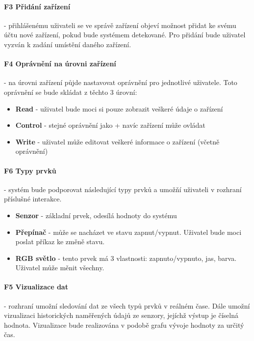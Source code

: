\paragraph{F3 Přidání zařízení}
- přihlášenému uživateli se ve správě zařízení objeví možnost přidat ke svému účtu nové zařízení, pokud bude systémem detekované. Pro přidání bude uživatel vyzván k zadání umístění daného zařízení.

\paragraph{F4 Oprávnění na úrovni zařízení}
- na úrovni zařízení půjde nastavovat oprávnění pro jednotlivé uživatele. Toto oprávnění se bude skládat z těchto 3 úrovní:
\begin{itemize}
    \item \textbf{Read} - uživatel bude moci si pouze zobrazit veškeré údaje o zařízení
    \item \textbf{Control} - stejné oprávnění jako  + navíc zařízení může ovládat
    \item \textbf{Write} - uživatel může editovat veškeré informace o zařízení (včetně oprávnění)
\end{itemize}

\paragraph{F6 Typy prvků}
- systém bude podporovat následující typy prvků a umožňí uživateli v rozhraní příslušné interakce.
\begin{itemize}
    \item \textbf{Senzor} - základní prvek, odesílá hodnoty do systému
    \item \textbf{Přepínač} - může se nacházet ve stavu zapnut/vypnut. Uživatel bude moci poslat příkaz ke změně stavu.
    \item \textbf{RGB světlo} - tento prvek má 3 vlastnosti: zapnuto/vypnuto, jas, barva. Uživatel může měnit všechny.
\end{itemize}

\paragraph{F5 Vizualizace dat}
- rozhraní umožní sledování dat ze všech typů prvků v reálném čase. Dále umožní vizualizaci historických naměřených údajů ze senzory, jejíchž výstup je číselná hodnota. Vizualizace bude realizována v podobě grafu vývoje hodnoty za určitý čas.

